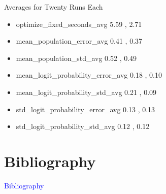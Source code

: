 \documentclass{beamer}
\newcommand{\Blue}[1]{\textcolor{blue}{#1}}
\newcommand{\Section}[1]{
	\section{#1}
	\begin{frame}
	\begin{center}
	\Blue{ \Large{#1} }
	\end{center}
	\end{frame}
}
\begin{document}
\begin{frame}{Averages for Twenty Runs Each}
\begin{itemize}

\item
optimize\_fixed\_seconds\_avg
\hspace{2.3em} 5.59 , 2.71
\pause

\item
mean\_population\_error\_avg
\hspace{2.35em} 0.41 , 0.37
\pause

\item
mean\_population\_std\_avg
\hspace{3.05em} 0.52 , 0.49
\pause

\item
mean\_logit\_probability\_error\_avg
\hspace{0.2em} 0.18 , 0.10
\pause

\item
mean\_logit\_probability\_std\_avg
\hspace{0.9em} 0.21 , 0.09
\pause

\item
std\_logit\_probability\_error\_avg
\hspace{1.2em} 0.13 , 0.13
\pause

\item
std\_logit\_probability\_std\_avg
\hspace{1.85em} 0.12 , 0.12
\pause


\end{itemize}
\end{frame}

\Section{Bibliography}
%
{}

\end{document}
